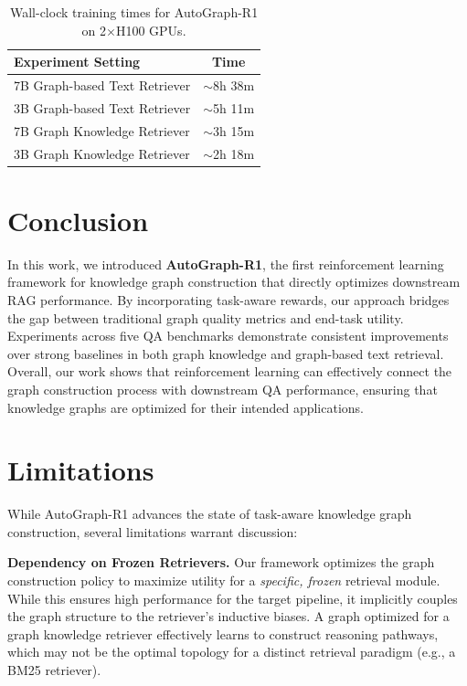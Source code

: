 \documentclass[11pt]{article}
\begin{document}
\begin{table}[!ht]
\centering
\small
\caption{Wall-clock training times for AutoGraph-R1 on 2$\times$H100 GPUs.}
\begin{tabular}{lc}
\toprule
\textbf{Experiment Setting} & \textbf{Time} \\
\midrule
7B Graph-based Text Retriever & $\sim$8h 38m \\
3B Graph-based Text Retriever & $\sim$5h 11m \\
7B Graph Knowledge Retriever  & $\sim$3h 15m \\
3B Graph Knowledge Retriever  & $\sim$2h 18m \\
\bottomrule
\end{tabular}
\label{tab:training_time}
\end{table}


\section{Conclusion}
In this work, we introduced \textbf{AutoGraph-R1}, the first reinforcement learning framework for knowledge graph construction that directly optimizes downstream RAG performance. By incorporating task-aware rewards, our approach bridges the gap between traditional graph quality metrics and end-task utility. Experiments across five QA benchmarks demonstrate consistent improvements over strong baselines in both graph knowledge and graph-based text retrieval. Overall, our work shows that reinforcement learning can effectively connect the graph construction process with downstream QA performance, ensuring that knowledge graphs are optimized for their intended applications.




\section{Limitations}
\label{sec:limitations}

While AutoGraph-R1 advances the state of task-aware knowledge graph construction, several limitations warrant discussion:

\textbf{Dependency on Frozen Retrievers.} Our framework optimizes the graph construction policy to maximize utility for a \textit{specific, frozen} retrieval module. While this ensures high performance for the target pipeline, it implicitly couples the graph structure to the retriever's inductive biases. A graph optimized for a graph knowledge retriever effectively learns to construct reasoning pathways, which may not be the optimal topology for a distinct retrieval paradigm (e.g., a BM25 retriever).
\end{document}
